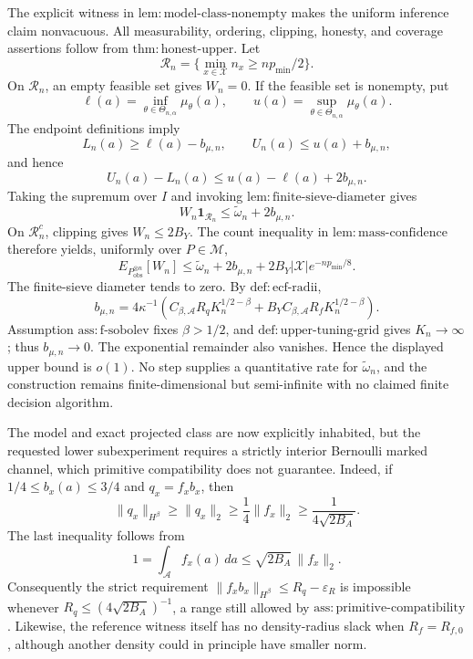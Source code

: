 The explicit witness in \(\mathrm{lem{:}model\text{-}class\text{-}nonempty}\) makes the uniform inference claim nonvacuous.  All measurability, ordering, clipping, honesty, and coverage assertions follow from \(\mathrm{thm{:}honest\text{-}upper}\).  Let
\[
 \mathcal R_n=\{\min_{x\in\mathcal X}n_x\ge np_{\min}/2\}.
\]
On \(\mathcal R_n\), an empty feasible set gives \(W_n=0\).  If the feasible set is nonempty, put
\[
 \ell(a)=\inf_{\theta\in\Theta_{n,\alpha}}\mu_\theta(a),
 \qquad
 u(a)=\sup_{\theta\in\Theta_{n,\alpha}}\mu_\theta(a).
\]
The endpoint definitions imply
\[
 L_n(a)\ge\ell(a)-b_{\mu,n},
 \qquad
 U_n(a)\le u(a)+b_{\mu,n},
\]
and hence
\[
 U_n(a)-L_n(a)
 \le u(a)-\ell(a)+2b_{\mu,n}.
\]
Taking the supremum over \(I\) and invoking \(\mathrm{lem{:}finite\text{-}sieve\text{-}diameter}\) gives
\[
 W_n\mathbf1_{\mathcal R_n}
 \le\widetilde\omega_n+2b_{\mu,n}.
\]
On \(\mathcal R_n^c\), clipping gives \(W_n\le2B_Y\).  The count inequality in \(\mathrm{lem{:}mass\text{-}confidence}\) therefore yields, uniformly over \(P\in\mathcal M\),
\[
 E_{P_{\mathrm{obs}}^{\otimes n}}[W_n]
 \le\widetilde\omega_n+2b_{\mu,n}
   +2B_Y|\mathcal X|e^{-np_{\min}/8}.
\]
The finite-sieve diameter tends to zero.  By \(\mathrm{def{:}ecf\text{-}radii}\),
\[
 b_{\mu,n}=4\kappa^{-1}
 \left(C_{\beta,\mathcal A}R_qK_n^{1/2-\beta}
 +B_YC_{\beta,\mathcal A}R_fK_n^{1/2-\beta}\right).
\]
Assumption \(\mathrm{ass{:}f\text{-}sobolev}\) fixes \(\beta>1/2\), and \(\mathrm{def{:}upper\text{-}tuning\text{-}grid}\) gives \(K_n\to\infty\); thus \(b_{\mu,n}\to0\).  The exponential remainder also vanishes.  Hence the displayed upper bound is \(o(1)\).  No step supplies a quantitative rate for \(\widetilde\omega_n\), and the construction remains finite-dimensional but semi-infinite with no claimed finite decision algorithm.

The model and exact projected class are now explicitly inhabited, but the requested lower subexperiment requires a strictly interior Bernoulli marked channel, which primitive compatibility does not guarantee.  Indeed, if \(1/4\le b_x(a)\le3/4\) and \(q_x=f_xb_x\), then
\[
 \|q_x\|_{H^\beta}\ge\|q_x\|_2
 \ge\frac14\|f_x\|_2
 \ge\frac{1}{4\sqrt{2B_A}}.
\]
The last inequality follows from
\[
 1=\int_{\mathcal A}f_x(a)\,da
 \le\sqrt{2B_A}\,\|f_x\|_2.
\]
Consequently the strict requirement \(\|f_xb_x\|_{H^\beta}\le R_q-\varepsilon_R\) is impossible whenever \(R_q\le(4\sqrt{2B_A})^{-1}\), a range still allowed by \(\mathrm{ass{:}primitive\text{-}compatibility}\).  Likewise, the reference witness itself has no density-radius slack when \(R_f=R_{f,0}\), although another density could in principle have smaller norm.

